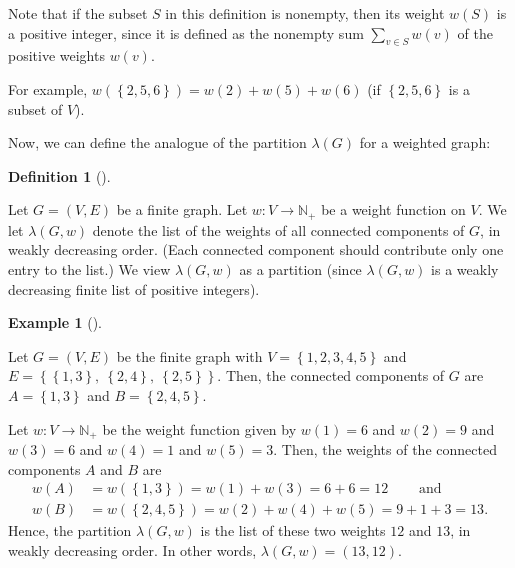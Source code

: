 \documentclass[numbers=enddot,12pt,final,onecolumn,notitlepage]{scrartcl}%
\theoremstyle{definition}
\newtheorem{defi}[theo]{Definition}
\newenvironment{definition}[1][]
{\begin{defi}[#1]\begin{leftbar}}
{\end{leftbar}\end{defi}}
\newtheorem{exmp}[theo]{Example}
\newenvironment{example}[1][]
{\begin{exmp}[#1]\begin{leftbar}}
{\end{leftbar}\end{exmp}}
\let\sumnonlimits\sum
\renewcommand{\sum}{\sumnonlimits\limits}
\begin{document}
Note that if the subset $S$ in this definition is nonempty, then its weight
$w\left(  S\right)  $ is a positive integer, since it is defined as the
nonempty sum $\sum_{v\in S}w\left(  v\right)  $ of the positive weights
$w\left(  v\right)  $.

For example, $w\left(  \left\{  2,5,6\right\}  \right)  =w\left(  2\right)
+w\left(  5\right)  +w\left(  6\right)  $ (if $\left\{  2,5,6\right\}  $ is a
subset of $V$).

Now, we can define the analogue of the partition $\lambda\left(  G\right)  $
for a weighted graph:

\begin{definition}
\label{def.wlambda}Let $G=\left(  V,E\right)  $ be a finite graph. Let
$w:V\rightarrow\mathbb{N}_{+}$ be a weight function on $V$. We let
$\lambda\left(  G,w\right)  $ denote the list of the weights of all connected
components of $G$, in weakly decreasing order. (Each connected component
should contribute only one entry to the list.) We view $\lambda\left(
G,w\right)  $ as a partition (since $\lambda\left(  G,w\right)  $ is a weakly
decreasing finite list of positive integers).
\end{definition}

\begin{example}
Let $G=\left(  V,E\right)  $ be the finite graph with $V=\left\{
1,2,3,4,5\right\}  $ and $E=\left\{  \left\{  1,3\right\}  ,\ \left\{
2,4\right\}  ,\ \left\{  2,5\right\}  \right\}  $. Then, the connected
components of $G$ are $A=\left\{  1,3\right\}  $ and $B=\left\{
2,4,5\right\}  $.

Let $w:V\rightarrow\mathbb{N}_{+}$ be the weight function given by $w\left(
1\right)  =6$ and $w\left(  2\right)  =9$ and $w\left(  3\right)  =6$ and
$w\left(  4\right)  =1$ and $w\left(  5\right)  =3$. Then, the weights of the
connected components $A$ and $B$ are
\begin{align*}
w\left(  A\right)   &  =w\left(  \left\{  1,3\right\}  \right)  =w\left(
1\right)  +w\left(  3\right)  =6+6=12\ \ \ \ \ \ \ \ \ \ \text{and}\\
w\left(  B\right)   &  =w\left(  \left\{  2,4,5\right\}  \right)  =w\left(
2\right)  +w\left(  4\right)  +w\left(  5\right)  =9+1+3=13.
\end{align*}
Hence, the partition $\lambda\left(  G,w\right)  $ is the list of these two
weights $12$ and $13$, in weakly decreasing order. In other words,
$\lambda\left(  G,w\right)  =\left(  13,12\right)  $.
\end{example}
\end{document}
